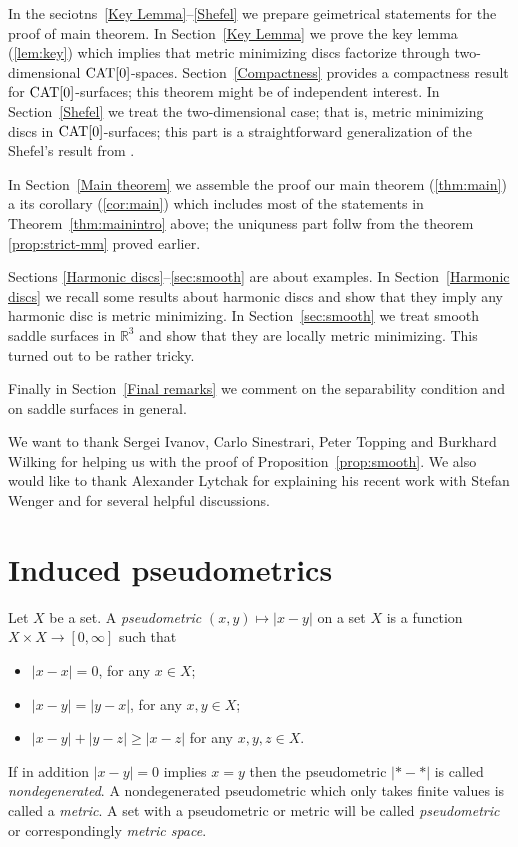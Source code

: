 \documentclass{article}
\begin{document}
In the seciotns~\ref{Key Lemma}--\ref{Shefel} we prepare geimetrical statements for the proof of main theorem.
In Section~\ref{Key Lemma} we prove the key lemma (\ref{lem:key}) which implies that metric minimizing discs factorize through two-dimensional $\mathop{\rm CAT}\nolimits[0]$-spaces. 
Section~\ref{Compactness} provides a compactness result for $\mathop{\rm CAT}\nolimits[0]$-surfaces;
this theorem might be of independent interest. 
In Section~\ref{Shefel} we treat the two-dimensional case; 
that is, metric minimizing discs in $\mathop{\rm CAT}\nolimits[0]$-surfaces;
this part is a straightforward generalization of the Shefel's result from \cite{shefel-2D}. 

In Section~\ref{Main theorem} we assemble the proof our main theorem (\ref{thm:main}) a its corollary (\ref{cor:main}) which includes most of the statements in Theorem~\ref{thm:mainintro} above; the uniquness part follw from the  theorem \ref{prop:strict-mm} proved earlier.

Sections \ref{Harmonic discs}--\ref{sec:smooth} are about examples.
In Section~\ref{Harmonic discs} we recall some results about  harmonic discs and show that they imply any harmonic disc is metric minimizing. 
In Section~\ref{sec:smooth} we treat smooth saddle surfaces in $\mathbb{R}^3$ and show that they are locally metric minimizing.
This turned out to be rather tricky.

Finally in Section~\ref{Final remarks} we comment on the separability condition and on saddle 
surfaces in general.

We want to thank 
Sergei Ivanov, 
Carlo Sinestrari, 
Peter Topping 
and Burkhard Wilking 
for helping us with the proof of Proposition~\ref{prop:smooth}.
We also would like to thank Alexander Lytchak for explaining his recent work with Stefan Wenger and for several helpful discussions.

\section{Induced  pseudometrics}\label{sec:Def}

Let $X$ be a set.
A \emph{pseudometric} $(x,y)\mapsto |x-y|$ on a set $X$ 
is a function $X\times X\to[0,\infty]$
such that 
\begin{itemize}
\item $|x-x|=0$, for any $x\in X$;
\item $|x-y|=|y-x|$, for any $x,y\in X$;
\item $|x-y|+|y-z|\ge|x-z|$ for any  $x,y,z\in X$.
\end{itemize}
If in addition $|x-y|=0$ implies $x=y$ then the pseudometric $|{*}-{*}|$ is called \emph{nondegenerated}.
A nondegenerated pseudometric which only takes finite values is called a \emph{metric}. 
A set with a pseudometric or metric will be called \emph{pseudometric} or correspondingly \emph{metric space}.
\end{document}
